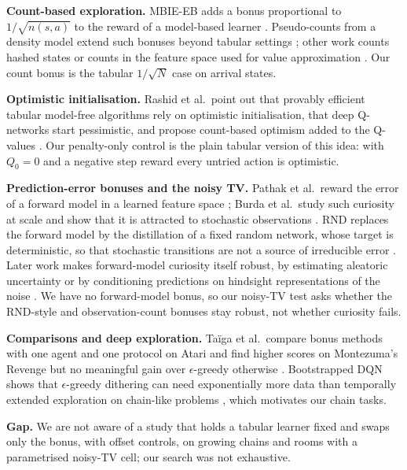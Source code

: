 \textbf{Count-based exploration.} MBIE-EB adds a bonus proportional to $1/\sqrt{n(s,a)}$ to the reward of a model-based learner \cite{strehl2008analysis}. Pseudo-counts from a density model extend such bonuses beyond tabular settings \cite{bellemare2016unifying,ostrovski2017count}; other work counts hashed states \cite{tang2016exploration} or counts in the feature space used for value approximation \cite{martin2017count}. Our count bonus is the tabular $1/\sqrt{N}$ case on arrival states.

\textbf{Optimistic initialisation.} Rashid et al.\ point out that provably efficient tabular model-free algorithms rely on optimistic initialisation, that deep Q-networks start pessimistic, and propose count-based optimism added to the Q-values \cite{rashid2020optimistic}. Our penalty-only control is the plain tabular version of this idea: with $Q_0=0$ and a negative step reward every untried action is optimistic.

\textbf{Prediction-error bonuses and the noisy TV.} Pathak et al.\ reward the error of a forward model in a learned feature space \cite{pathak2017curiosity}; Burda et al.\ study such curiosity at scale and show that it is attracted to stochastic observations \cite{burda2018large}. RND replaces the forward model by the distillation of a fixed random network, whose target is deterministic, so that stochastic transitions are not a source of irreducible error \cite{burda2018exploration}. Later work makes forward-model curiosity itself robust, by estimating aleatoric uncertainty \cite{mavorparker2021how} or by conditioning predictions on hindsight representations of the noise \cite{jarrett2022curiosity}. We have no forward-model bonus, so our noisy-TV test asks whether the RND-style and observation-count bonuses stay robust, not whether curiosity fails.

\textbf{Comparisons and deep exploration.} Ta\"iga et al.\ compare bonus methods with one agent and one protocol on Atari and find higher scores on Montezuma's Revenge but no meaningful gain over $\epsilon$-greedy otherwise \cite{taga2021bonus}. Bootstrapped DQN shows that $\epsilon$-greedy dithering can need exponentially more data than temporally extended exploration on chain-like problems \cite{osband2016deep}, which motivates our chain tasks.

\textbf{Gap.} We are not aware of a study that holds a tabular learner fixed and swaps only the bonus, with offset controls, on growing chains and rooms with a parametrised noisy-TV cell; our search was not exhaustive.

